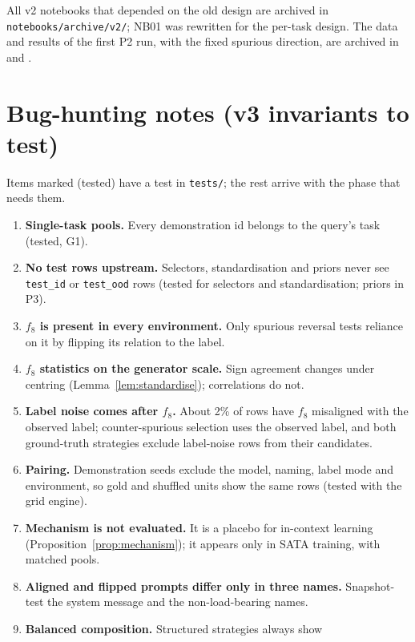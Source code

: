 \documentclass[11pt,a4paper]{article}
\newcommand{\1}{\mathbf{1}}
\theoremstyle{plain}
\theoremstyle{definition}
\theoremstyle{remark}
\begin{document}
All v2 notebooks that depended on the old design are archived in
\texttt{notebooks/archive/v2/}; NB01 was rewritten for the per-task design.
The data and results of the first P2 run, with the fixed spurious
direction, are archived in  and
.

\section{Bug-hunting notes (v3 invariants to test)}

Items marked (tested) have a test in \texttt{tests/}; the rest arrive with
the phase that needs them.

\begin{enumerate}
  \item \textbf{Single-task pools.} Every demonstration id belongs to the
        query's task (tested, G1).
  \item \textbf{No test rows upstream.} Selectors, standardisation and
        priors never see \texttt{test\_id} or \texttt{test\_ood} rows (tested for selectors and standardisation; priors in P3).
  \item \textbf{$f_8$ is present in every environment.} Only spurious
        reversal tests reliance on it by flipping its relation to the label.
  \item \textbf{$f_8$ statistics on the generator scale.} Sign agreement
        changes under centring (Lemma~\ref{lem:standardise}); correlations
        do not.
  \item \textbf{Label noise comes after $f_8$.} About 2\% of rows have $f_8$
        misaligned with the observed label; counter-spurious selection uses
        the observed label, and both ground-truth strategies exclude
        label-noise rows from their candidates.
  \item \textbf{Pairing.} Demonstration seeds exclude the model, naming,
        label mode and environment, so gold and shuffled units show the same
        rows (tested with the grid engine).
  \item \textbf{Mechanism is not evaluated.} It is a placebo for in-context
        learning (Proposition~\ref{prop:mechanism}); it appears only in
        SATA training, with matched pools.
  \item \textbf{Aligned and flipped prompts differ only in three names.}
        Snapshot-test the system message and the non-load-bearing names.
  \item \textbf{Balanced composition.} Structured strategies always show

\end{enumerate}
\end{document}

